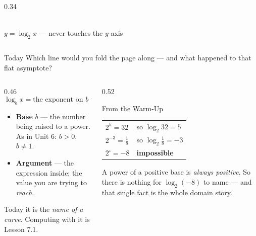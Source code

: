 \documentclass[aspectratio=169, 11pt]{beamer}
\newcommand{\logcurve}[5]{\draw[very thick, forest, domain=#4:#5, samples=120, smooth]
  plot ({pow(#1,\x-(#3))+(#2)},{\x});}
\begin{document}
\begin{frame}[t, plain]
\begin{columns}[T]
\begin{column}{0.34\textwidth}
\\[2pt]
      {\footnotesize $y=\log_2 x$ --- never touches the $y$-axis}
    \end{column}
  \end{columns}
  \begin{block}{Today}
    Which line would you fold the page along --- and what happened to that flat asymptote?
  \end{block}
\end{frame}

\begin{frame}[t, plain]
  \begin{columns}[T]
    \begin{column}{0.46\textwidth}
      \[ \log_b x = \text{the exponent on } b \text{ that gives } x \]
      \begin{itemize}\setlength{\itemsep}{4pt}
        \item \textbf{Base} $b$ --- the number being raised to a power. As in Unit 6: $b>0$, $b\ne1$.
        \item \textbf{Argument} --- the expression inside; the value you are trying to \emph{reach}.
      \end{itemize}
      \vspace{2pt}
      {\footnotesize Today it is the \emph{name of a curve}. Computing with it is Lesson 7.1.}
    \end{column}
    \begin{column}{0.52\textwidth}
      \begin{block}{From the Warm-Up}
        \centering
        \begin{tabular}{ll}
        $2^5=32$ & so $\log_2 32 = 5$ \\[3pt]
        $2^{-3}=\tfrac18$ & so $\log_2 \tfrac18 = -3$ \\[3pt]
        $2^{\square}=-8$ & \textbf{impossible} \\
        \end{tabular}
      \end{block}
      \vspace{3pt}
      {\footnotesize A power of a positive base is \emph{always positive}. So there is nothing for
      $\log_2(-8)$ to name --- and that single fact is the whole domain story.}
    \end{column}
  \end{columns}
\end{frame}
\end{document}
